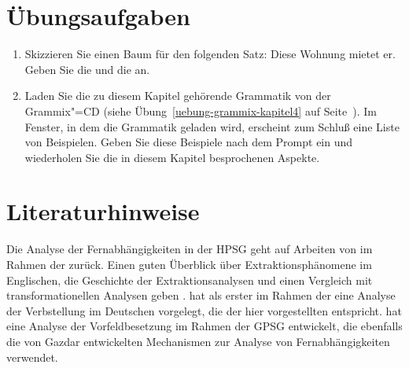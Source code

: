\section*{Übungsaufgaben}

\begin{enumerate}
\item Skizzieren Sie einen Baum für den folgenden Satz:
\ea
Diese Wohnung mietet er.
\z
Geben Sie die \slashwe und die \dslwe an.

\item Laden Sie die zu diesem Kapitel gehörende Grammatik von der Grammix"=CD
(siehe Übung~\ref{uebung-grammix-kapitel4} auf Seite~\pageref{uebung-grammix-kapitel4}).
Im Fenster, in dem die Grammatik geladen wird, erscheint zum Schluß eine Liste von Beispielen.
Geben Sie diese Beispiele nach dem Prompt ein und wiederholen Sie die in diesem Kapitel besprochenen
Aspekte.

\end{enumerate}



\section*{Literaturhinweise}


Die Analyse der Fernabhängigkeiten in der HPSG geht auf Arbeiten von \citet{Gazdar81} im Rahmen der
\gpsg zurück. Einen guten Überblick über Extraktionsphänomene im Englischen, die Geschichte der
Extraktionsanalysen und einen Vergleich mit transformationellen Analysen geben
\citet{LH2006a}. \citet{Thiersch78a} hat als erster im Rahmen der \gbt eine Analyse der Verbstellung
im Deutschen vorgelegt, die der hier vorgestellten entspricht. \citet{Uszkoreit87a} hat eine Analyse
der Vorfeldbesetzung im Rahmen der GPSG entwickelt, die ebenfalls die von Gazdar entwickelten
Mechanismen zur Analyse von Fernabhängigkeiten verwendet.





